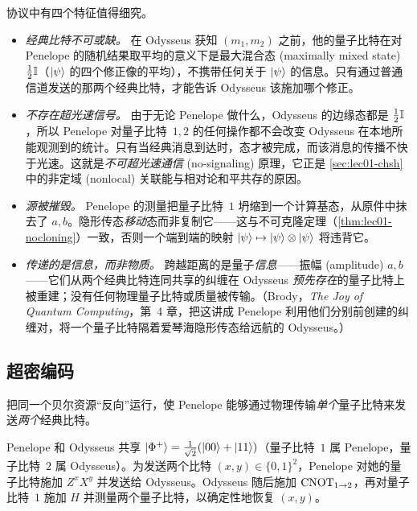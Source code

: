 \begin{remark}
协议中有四个特征值得细究。
\begin{itemize}[nosep]
  \item \emph{经典比特不可或缺。} 在 Odysseus 获知 $(m_1,m_2)$ 之前，他的量子比特在对 Penelope 的随机结果取平均的意义下是最大混合态 (maximally mixed state) $\tfrac12\mathbb{I}$（$\ket{\psi}$ 的四个修正像的平均），不携带任何关于 $\ket{\psi}$ 的信息。只有通过普通信道发送的那两个经典比特，才能告诉 Odysseus 该施加哪个修正。
  \item \emph{不存在超光速信号。} 由于无论 Penelope 做什么，Odysseus 的边缘态都是 $\tfrac12\mathbb{I}$，所以 Penelope 对量子比特~$1,2$ 的任何操作都不会改变 Odysseus 在本地所能观测到的统计。只有当经典消息到达时，态才被完成，而该消息的传播不快于光速。这就是\emph{不可超光速通信} (no-signaling) 原理，它正是 \cref{sec:lec01-chsh} 中的非定域 (nonlocal) 关联能与相对论和平共存的原因。
  \item \emph{源被摧毁。} Penelope 的测量把量子比特~$1$ 坍缩到一个计算基态，从原件中抹去了 $a,b$。隐形传态\emph{移动}态而非复制它——这与不可克隆定理（\cref{thm:lec01-nocloning}）一致，否则一个端到端的映射 $\ket{\psi}\mapsto\ket{\psi}\otimes\ket{\psi}$ 将违背它。
  \item \emph{传递的是信息，而非物质。} 跨越距离的是量子\emph{信息}——振幅 (amplitude) $a,b$——它们从两个经典比特连同共享的纠缠在 Odysseus \emph{预先存在}的量子比特上被重建；没有任何物理量子比特或质量被传输。（Brody，\emph{The Joy of Quantum Computing}，第~4 章，把这讲成 Penelope 利用他们分别前创建的纠缠对，将一个量子比特隔着爱琴海隐形传态给远航的 Odysseus。）
\end{itemize}
\end{remark}

\subsection{超密编码}

把同一个贝尔资源``反向''运行，使 Penelope 能够通过物理传输\emph{单个}量子比特来发送\emph{两个}经典比特。

\begin{proposition}[超密编码]\label{prop:lec01-superdense}
Penelope 和 Odysseus 共享 $\ket{\Phi^{+}}=\tfrac{1}{\sqrt2}(\ket{00}+\ket{11})$（量子比特~$1$ 属 Penelope，量子比特~$2$ 属 Odysseus）。为发送两个比特 $(x,y)\in\{0,1\}^2$，Penelope 对她的量子比特施加 $Z^{x}X^{y}$ 并发送给 Odysseus。Odysseus 随后施加 $\mathrm{CNOT}_{1\to2}$，再对量子比特~$1$ 施加 $H$ 并测量两个量子比特，以确定性地恢复 $(x,y)$。
\end{proposition}

